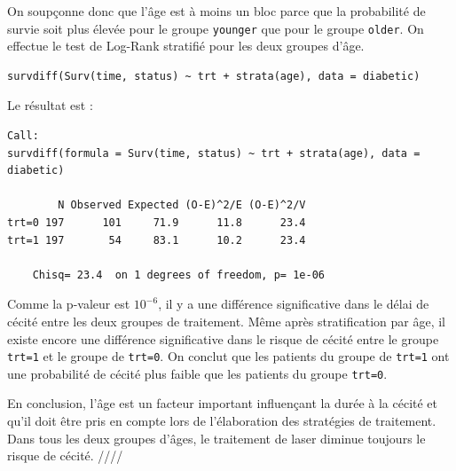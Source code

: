 \documentclass[../main.tex]{subfiles}
\begin{document}
\begin{CJK*}{UTF8}{gbsn}
On soupçonne donc que l'âge est à moins un bloc parce que 
la probabilité de survie soit plus 
élevée pour le groupe \texttt{younger} que pour le groupe \texttt{older}. 
On effectue le test de Log-Rank stratifié pour les deux groupes d'âge.

\begin{lstlisting}
survdiff(Surv(time, status) ~ trt + strata(age), data = diabetic)
\end{lstlisting}

Le résultat est :

\begin{lstlisting}    
Call:
survdiff(formula = Surv(time, status) ~ trt + strata(age), data = diabetic)
        
        N Observed Expected (O-E)^2/E (O-E)^2/V
trt=0 197      101     71.9      11.8      23.4
trt=1 197       54     83.1      10.2      23.4
        
    Chisq= 23.4  on 1 degrees of freedom, p= 1e-06
\end{lstlisting}

Comme la p-valeur est $10^{-6}$,
il y a une différence significative dans le délai de cécité entre les deux groupes de traitement.
Même après stratification par âge, il existe encore une différence 
significative dans le risque de cécité entre le groupe \texttt{trt=1}
et le groupe de \texttt{trt=0}. 
On conclut que les patients du groupe de \texttt{trt=1} 
ont une probabilité de cécité plus faible que 
les patients du groupe \texttt{trt=0}. 

En conclusion, l'âge est un facteur important influençant la durée à la cécité 
et qu'il doit être pris en compte lors de l'élaboration des stratégies de traitement.
Dans tous les deux groupes d'âges, le traitement de laser diminue toujours 
le risque de cécité. ////

\end{CJK*}
\end{document}
